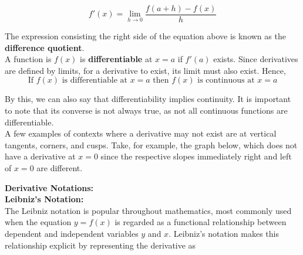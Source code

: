 \documentclass{article}
\begin{document}
            \begin{equation*}
                f'(x) = \lim_{h\to 0} \frac{f(a+h)-f(x)}{h}
            \end{equation*}

            \noindent The expression consisting the right side of the equation above is known as the
            \textbf{difference quotient}. \\

            \noindent A function is $f(x)$ is \textbf{differentiable} at $x=a
            $ if $f'(a)$ exists. Since derivatives are defined by limits, for a derivative to exist,
            its limit must also exist. Hence, \\

            \begin{equation*}
                \text{If $f(x)$ is differentiable at $x=a$ then $f(x)$ is continuous at $x=a$}
            \end{equation*}

            \noindent By this, we can also say that differentiability implies continuity. It is
            important to note that its converse is not always true, as not all continuous functions
            are differentiable. \\


            \noindent A few examples of contexts where a derivative may not exist are at vertical
            tangents, corners, and cusps. Take, for example, the graph below, which does not have a
            derivative at $x=0$ since the respective slopes immediately right and left of $x=0$ are
            different. \\

            \begin{center}
            \end{center}

            \noindent \color{purple} \textbf{Derivative Notations:} \\
            \noindent \textbf{Leibniz's Notation:} \color{black} \\
            The Leibniz notation is popular throughout mathematics, most commonly used when the
            equation $y=f(x)$ is regarded as a functional relationship between dependent and
            independent variables $y$ and $x$. Leibniz's notation makes this relationship explicit
            by representing the derivative as \\
\end{document}
